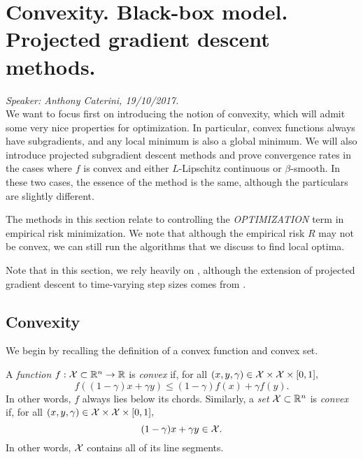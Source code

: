 
\chapter{Convexity. Black-box model. Projected gradient descent methods.}
\emph{Speaker: Anthony Caterini, 19/10/2017.}\\

We want to focus first on introducing the notion of convexity, which will admit some very nice properties for optimization. In particular, convex functions always have subgradients, and any local minimum is also a global minimum. We will also introduce projected subgradient descent methods and prove convergence rates in the cases where $f$ is convex and either $L$-Lipschitz continuous or $\beta$-smooth. In these two cases, the essence of the method is the same, although the particulars are slightly different.

The methods in this section relate to controlling the \emph{OPTIMIZATION} term in empirical risk minimization. We note that although the empirical risk $R$ may not be convex, we can still run the algorithms that we discuss to find local optima.

Note that in this section, we rely heavily on \cite{bubeck}, although the extension of projected gradient descent to time-varying step sizes comes from \cite[Lecture~11,~Page~5]{rigollet}.

\section{Convexity}

We begin by recalling the definition of a convex function and convex set.

\begin{definition}
A \emph{function} $f : \mathcal{X} \subset \mathbb{R}^n \rightarrow \mathbb{R}$ is \emph{convex} if, for all $(x, y, \gamma) \in \mathcal{X} \times \mathcal{X} \times [0,1],$
\[
f( (1 - \gamma) x + \gamma y ) \leq (1 - \gamma) f(x) + \gamma f(y).
\]
In other words, $f$ always lies below its chords. Similarly, a \emph{set} $\mathcal{X} \subset \mathbb{R}^n$ is \emph{convex} if, for all $(x, y, \gamma) \in \mathcal{X} \times \mathcal{X} \times [0,1],$
\[
(1 - \gamma) x + \gamma y \in \mathcal{X}.
\]
In other words, $\mathcal{X}$ contains all of its line segments.
\end{definition}

